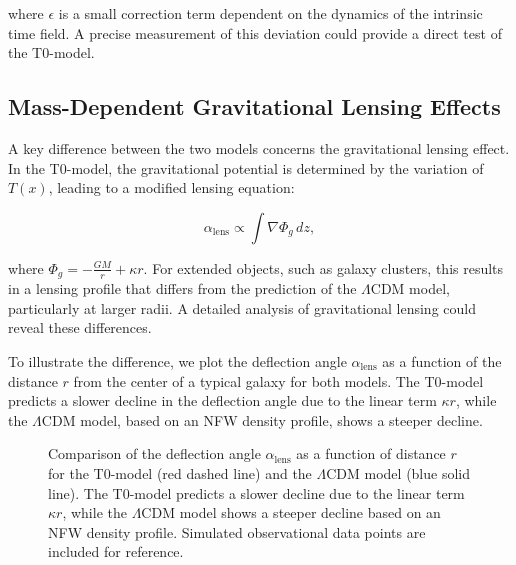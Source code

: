 \documentclass[a4paper,12pt]{article}
\newcommand{\Tfield}{T(x)}
\begin{document}
	where \( \epsilon \) is a small correction term dependent on the dynamics of the intrinsic time field. A precise measurement of this deviation could provide a direct test of the T0-model.
	
	\subsection{Mass-Dependent Gravitational Lensing Effects}
	
	A key difference between the two models concerns the gravitational lensing effect. In the T0-model, the gravitational potential is determined by the variation of \( \Tfield \), leading to a modified lensing equation:
	
	\begin{equation}
		\alpha_{\text{lens}} \propto \int \nabla \Phi_g \, dz,
	\end{equation}
	
	where \( \Phi_g = -\frac{G M}{r} + \kappa r \). For extended objects, such as galaxy clusters, this results in a lensing profile that differs from the prediction of the \( \Lambda \)CDM model, particularly at larger radii. A detailed analysis of gravitational lensing could reveal these differences.
	
	To illustrate the difference, we plot the deflection angle \( \alpha_{\text{lens}} \) as a function of the distance \( r \) from the center of a typical galaxy for both models. The T0-model predicts a slower decline in the deflection angle due to the linear term \( \kappa r \), while the \( \Lambda \)CDM model, based on an NFW density profile, shows a steeper decline.
	
	\begin{figure}[h]
		\centering
		\caption{Comparison of the deflection angle \( \alpha_{\text{lens}} \) as a function of distance \( r \) for the T0-model (red dashed line) and the \( \Lambda \)CDM model (blue solid line). The T0-model predicts a slower decline due to the linear term \( \kappa r \), while the \( \Lambda \)CDM model shows a steeper decline based on an NFW density profile. Simulated observational data points are included for reference.}
		\label{fig:lensing-profile}
	\end{figure}
	
\end{document}
